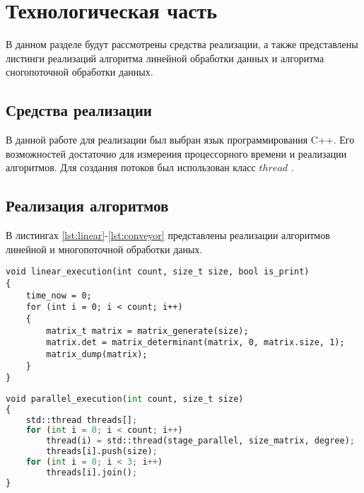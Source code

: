 \chapter{Технологическая часть}
\hspace{\parindent}В данном разделе будут рассмотрены средства реализации, а также представлены листинги реализаций алгоритма линейной обработки данных и алгоритма сногопоточной обработки данных.

\section{Средства реализации}
\hspace{\parindent}В данной работе для реализации был выбран язык программирования C++. Его возможностей достаточно для измерения процессорного времени и реализации алгоритмов. Для создания потоков был использован класс $thread$ \cite{thread}.


\section{Реализация алгоритмов}
\hspace{\parindent}В листингах \ref{lst:linear}-\ref{lst:conveyor} представлены реализации алгоритмов линейной и многопоточной обработки даных.
\clearpage

\begin{center}
	\captionsetup{justification=raggedright,singlelinecheck=off}
    \begin{lstlisting}[label=lst:linear, caption=Алгоритм линейной обработки данных]
void linear_execution(int count, size_t size, bool is_print)
{
	time_now = 0;
	for (int i = 0; i < count; i++)
	{
		matrix_t matrix = matrix_generate(size);
		matrix.det = matrix_determinant(matrix, 0, matrix.size, 1);
		matrix_dump(matrix);
	}
}
    \end{lstlisting}
\end{center}



\begin{center}
	\captionsetup{skip=0pt,justification=raggedright,singlelinecheck=off}
    \begin{lstlisting}[label=lst:conveyor,language=Python,caption=Алгоритм конвейерной обработки данных]
void parallel_execution(int count, size_t size)
{
	std::thread threads[];
	for (int i = 0; i < count; i++)
		thread(i) = std::thread(stage_parallel, size_matrix, degree);
		threads[i].push(size);
	for (int i = 0; i < 3; i++)
		threads[i].join();
}
\end{lstlisting}
\end{center}
\clearpage

